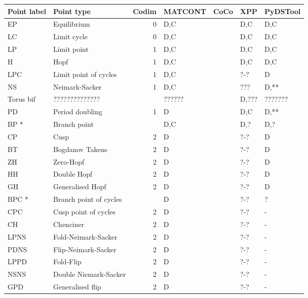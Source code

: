 \documentclass[a4paper,twoside]{article}
\begin{document}
\begin{center}
\begin{tabular}{llrllll}
Point label & Point type & Codim & MATCONT & CoCo & XPP & PyDSTool\\
\hline
EP & Equilibrium & 0 & D,C &  & D,C & D,C\\
LC & Limit cycle & 0 & D,C &  & D,C & D,C\\
LP & Limit point & 1 & D,C &  & D,C & D,C\\
H & Hopf & 1 & D,C &  & D,C & D,C\\
LPC & Limit point of cycles & 1 & D,C &  & ?-? & D\\
NS & Neimark-Sacker & 1 & D,C &  & ??? & D,**\\
Torus bif & ?????????????? &  & ?????? &  & D,??? & ???????\\
PD & Period doubling & 1 & D &  & D,C & D,**\\
BP * & Branch point &  & D,C &  & D,? & D,?\\
CP & Cusp & 2 & D &  & ?-? & D\\
BT & Bogdanov Takens & 2 & D &  & ?-? & D\\
ZH & Zero-Hopf & 2 & D &  & ?-? & D\\
HH & Double Hopf & 2 & D &  & ?-? & D\\
GH & Generalised Hopf & 2 & D &  & ?-? & D\\
BPC * & Branch point of cycles &  & D &  & ?-? & ?\\
CPC & Cusp point of cycles & 2 & D &  & ?-? & -\\
CH & Chenciner & 2 & D &  & ?-? & -\\
LPNS & Fold-Neimark-Sacker & 2 & D &  & ?-? & -\\
PDNS & Flip-Neimark-Sacker & 2 & D &  & ?-? & -\\
LPPD & Fold-Flip & 2 & D &  & ?-? & -\\
NSNS & Double Niemark-Sacker & 2 & D &  & ?-? & -\\
GPD & Generalised flip & 2 & D &  & ?-? & -\\
\end{tabular}
\end{center}
\end{document}

